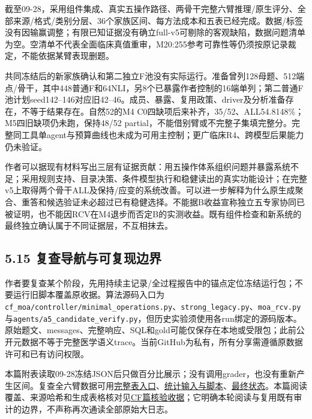 \documentclass[
  11pt,
  a4paper,
]{article}
\begin{document}
截至09-28，采用组件集成、真实五操作路径、两骨干完整六臂推理/原生评分、全部来源/格式/类别分层、36个家族区间、每方法成本和五表已经完成。数据/标签没有因输赢调整；有限已知证据没有确立full-v5可剔除的客观缺陷，数据问题清单为空。空清单不代表全面临床真值重审，M20:255参考可靠性等仍须按原记录裁定，不能依据某臂表现删题。

共同冻结后的新家族确认和第二独立F池没有实际运行。准备曾列128母题、512端点/骨干，其中448普通F和64NLI，另8个已暴露作者控制的16端单列；第二普通F池计划seed142--146对应旧42--46。成员、暴露、复用政策、driver及分析准备存在，不等于结果存在。自然52的M4
C0四缺项后来补齐，35/52、ALL54.8148\%；M5四旧缺项仍未跑，保持48/52
partial，不能借别臂或不完整子集填完整分。完整同工具单agent与预算曲线也未成为可用主控制；更广临床R4、跨模型后果能力仍未验证。

作者可以据现有材料写出三层有证据贡献：用五操作体系组织问题并暴露系统不足；采用规则支持、目录决策、条件模型执行和稳健读出的真实功能设计；在完整v5上取得两个骨干ALL及保持/应变的系统改善。可以进一步解释为什么原生成聚合、重答和候选验证未必超过已有稳健选择。不能据B收益宣称独立五专家协同已被证明，也不能因RCV在M4退步而否定B的实测收益。既有组件检查和新系统的最终独立确认属于不同证据层，不互相抹去。

\subsection{5.15
复查导航与可复现边界}\label{ux590dux67e5ux5bfcux822aux4e0eux53efux590dux73b0ux8fb9ux754c}

作者要复查某个阶段，先用持续主记录/全过程报告中的锚点定位冻结运行包；不要运行旧脚本覆盖原收据。算法源码入口为\texttt{cf\_\allowbreak{}moa/\allowbreak{}controller/\allowbreak{}minimal\_\allowbreak{}operations.\allowbreak{}py}、\texttt{strong\_\allowbreak{}legacy.\allowbreak{}py}、\texttt{moa\_\allowbreak{}rcv.\allowbreak{}py}与\texttt{agents/\allowbreak{}a5\_\allowbreak{}candidate\_\allowbreak{}verify.\allowbreak{}py}，但历史实验须使用各run绑定的源码版本。原始题文、messages、完整响应、SQL和gold可能仅保存在本地或受限包；此前公开元数据不等于完整医学语义trace。当前GitHub为私有，所有分享需遵循原数据许可和已有访问权限。

本篇附表读取09-28冻结JSON后只做百分比展示；没有调用grader，也没有重新产生区间。复查全六臂数据可用\href{https://github.com/xiotakut/cf_mrg/blob/main/benchmarks/2026-09-28_cf_moa_transparent_closeout/five_tables.md}{完整表入口}、\href{https://github.com/xiotakut/cf_mrg/blob/main/benchmarks/2026-09-28_cf_moa_transparent_closeout/statistics}{统计输入与脚本}、\href{https://github.com/xiotakut/cf_mrg/blob/main/benchmarks/2026-09-28_cf_moa_transparent_closeout/final_status.json}{最终状态}。本篇阅读覆盖、来源哈希和生成表格核对见\href{https://github.com/xiotakut/cf_mrg/blob/main/papers/2026-10-02_cf_moa/author_dossier/evidence/cf_moa_coverage.json}{CF篇核验收据}；它明确本轮阅读与复用既有审计的边界，不声称再次通读全部原始大日志。
\end{document}
